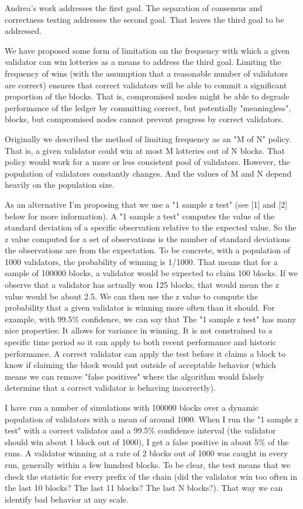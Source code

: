 Andrea's work addresses the first goal. The separation of
consensus and correctness testing addresses the second goal. That leaves
the third goal to be addressed.

We have proposed some form of limitation on the frequency with which a
given validator can win lotteries as a means to address the third
goal. Limiting the frequency of wins (with the assumption that a
reasonable number of validators are correct) ensures that correct
validators will be able to commit a significant proportion of the
blocks. That is, compromised nodes might be able to degrade performance
of the ledger by committing correct, but potentially "meaningless",
blocks, but compromised nodes cannot prevent progress by correct
validators.

Originally we described the method of limiting frequency as an "M of N"
policy. That is, a given validator could win at most M lotteries out of
N blocks. That policy would work for a more or less consistent pool of
validators. However, the population of validators constantly
changes. And the values of M and N depend heavily on the population
size.

As an alternative I'm proposing that we use a "1 sample z test" (see [1]
and [2] below for more information). A "1 sample z test" computes the
value of the standard deviation of a specific observation relative to
the expected value. So the z value computed for a set of observations is
the number of standard deviations the observations are from the
expectation. To be concrete, with a population of 1000 validators, the
probability of winning is 1/1000. That means that for a sample of 100000
blocks, a validator would be expected to claim 100 blocks. If we observe
that a validator has actually won 125 blocks, that would mean the z
value would be about 2.5. We can then use the z value to compute the
probability that a given validator is winning more often than it
should. For example, with 99.5\% confidence, we can say that The "1
sample z test" has many nice properties: It allows for variance in
winning. It is not constrained to a specific time period so it can apply
to both recent performance and historic performance. A correct validator
can apply the test before it claims a block to know if claiming the
block would put outside of acceptable behavior (which means we can
remove "false positives" where the algorithm would falsely determine
that a correct validator is behaving incorrectly).

I have run a number of simulations with 100000 blocks over a dynamic
population of validators with a mean of around 1000. When I run the "1
sample z test" with a correct validator and a 99.5\% confidence interval
(the validator should win about 1 block out of 1000), I get a false
positive in about 5\% of the runs. A validator winning at a rate of 2
blocks out of 1000 was caught in every run, generally within a few
hundred blocks. To be clear, the test means that we check the statistic
for every prefix of the chain (did the validator win too often in the
last 10 blocks? The last 11 blocks? The last N blocks?). That way we
can identify bad behavior at any scale.

